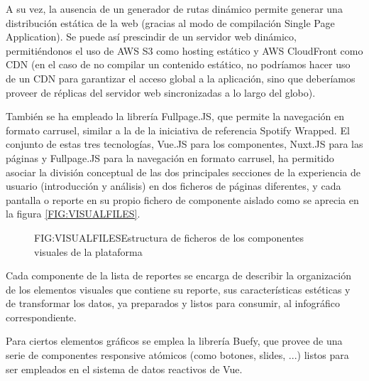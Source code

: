 A su vez, la ausencia de un generador de rutas dinámico permite generar una distribución estática de la web (gracias al modo de compilación Single Page Application). Se puede así prescindir de un servidor web dinámico, permitiéndonos el uso de AWS S3 como hosting estático y AWS CloudFront como CDN (en el caso de no compilar un contenido estático, no podríamos hacer uso de un CDN para garantizar el acceso global a la aplicación, sino que deberíamos proveer de réplicas del servidor web sincronizadas a lo largo del globo).

También se ha empleado la librería Fullpage.JS, que permite la navegación en formato carrusel\cite{FullpageJS}, similar a la de la iniciativa de referencia Spotify Wrapped. El conjunto de estas tres tecnologías, Vue.JS para los componentes, Nuxt.JS para las páginas y Fullpage.JS para la navegación en formato carrusel, ha permitido asociar la división conceptual de las dos principales secciones de la experiencia de usuario (introducción y análisis) en dos ficheros de páginas diferentes, y cada pantalla o reporte en su propio fichero de componente aislado como se aprecia en la figura \ref{FIG:VISUALFILES}.

\begin{figure}[Estructura de ficheros]{FIG:VISUALFILES}{Estructura de ficheros de los componentes visuales de la plataforma}
\end{figure}

Cada componente de la lista de reportes se encarga de describir la organización de los elementos visuales que contiene su reporte, sus características estéticas y de transformar los datos, ya preparados y listos para consumir, al infográfico correspondiente.

Para ciertos elementos gráficos se emplea la librería Buefy, que provee de una serie de componentes responsive atómicos (como botones, slides, ...) listos para ser empleados en el sistema de datos reactivos de Vue\cite{Buefy}.
